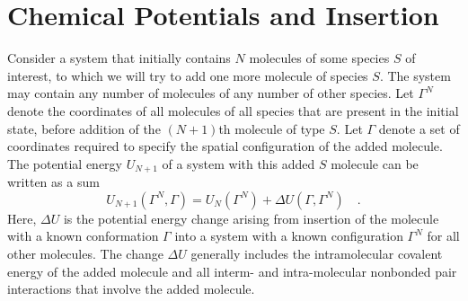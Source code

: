 \documentclass[12pt]{article} %
\newcommand\system{\Gamma^{N}}
\newcommand\chain{\Gamma}
\newcommand\Utot{U_{N+1}}
\newcommand\Usys{U_{N}}
\newcommand\delU{\Delta U}
\begin{document}



\section{Chemical Potentials and Insertion}
Consider a system that initially contains $N$ molecules of some species $S$ of interest, to which we will try to add one more molecule of species $S$. The system may contain any number of molecules of any number of other species. Let $\system$ denote the coordinates of all molecules of all species that are present in the initial state, before addition of the $(N+1)$th molecule of type $S$. Let $\chain$ denote a set of coordinates required to specify the spatial configuration of the added molecule. The potential energy $\Utot$ of a system with this added $S$ molecule can be written as a sum 
\begin{equation}
    \Utot(\system, \chain) = \Usys(\system) + \delU (\chain, \system) 
    \quad.
\end{equation}
Here, $\delU$ is the potential energy change arising from insertion of the molecule with a known conformation $\chain$ into a system with a known configuration $\system$ for all other molecules. The change $\delU$ generally includes the intramolecular covalent energy of the added molecule and all interm- and intra-molecular nonbonded pair interactions that involve the added molecule. 
\end{document}
